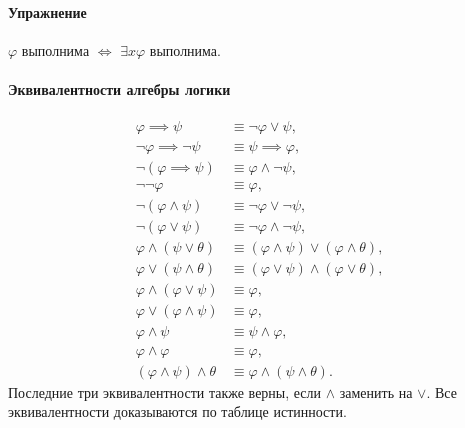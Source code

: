 \paragraph{Упражнение}
$\varphi$ выполнима $\iff$ $\exists x \varphi$ выполнима.

\paragraph{Эквивалентности алгебры логики}
\begin{align}
    \varphi \implies \psi &\equiv \neg \varphi \lor \psi, \\
    \neg \varphi \implies \neg \psi &\equiv \psi \implies \varphi, \\
    \neg (\varphi \implies \psi) &\equiv \varphi \land \neg \psi, \\
    \neg \neg \varphi &\equiv \varphi, \\
    \neg (\varphi \land \psi) &\equiv \neg \varphi \lor \neg \psi, \\
    \neg (\varphi \lor \psi) &\equiv \neg \varphi \land \neg \psi, \\
    \varphi \land (\psi \lor \theta) &\equiv  (\varphi \land \psi) \lor (\varphi \land \theta), \\
    \varphi \lor (\psi \land \theta) &\equiv (\varphi \lor \psi) \land (\varphi \lor \theta), \\
    \varphi \land (\varphi \lor \psi) &\equiv \varphi, \\
    \varphi \lor (\varphi \land \psi) &\equiv \varphi, \\
    \varphi \land \psi &\equiv \psi \land \varphi, \\
    \varphi \land \varphi &\equiv \varphi, \\
    (\varphi \land \psi) \land \theta &\equiv \varphi \land (\psi \land \theta).
 \end{align}
Последние три эквивалентности также верны, если $\land$ заменить на $\lor$.
Все эквивалентности доказываются по таблице истинности.

